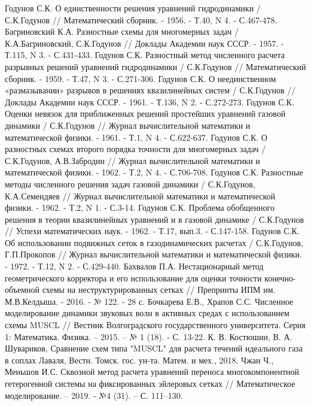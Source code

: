 \documentclass[12pt,a4paper]{article}
\begin{document}
\newpage
\begin{thebibliography}{3}
Годунов С.К. О единственности решения уравнений гидродинамики / С.К.Годунов // Математический сборник. - 1956. - Т.40, N 4. - С.467-478.
Багриновский К.А. Разностные схемы для многомерных задач / К.А.Багриновский, С.К.Годунов // Доклады Академии наук СССР. - 1957. - Т.115, N 3. - С.431-433.
Годунов С.К. Разностный метод численного расчета разрывных решений уравнений гидродинамики / С.К.Годунов // Математический сборник. - 1959. - Т.47, N 3. - С.271-306.
Годунов С.К. О неединственном «размазывании» разрывов в решениях квазилинейных систем / С.К.Годунов // Доклады Академии наук СССР. - 1961. - Т.136, N 2. - С.272-273.
Годунов С.К. Оценки невязок для приближенных решений простейших уравнений газовой динамики / С.К.Годунов // Журнал вычислительной математики и математической физики. - 1961. - Т.1, N 4. - С.622-637.
Годунов С.К. О разностных схемах второго порядка точности для многомерных задач / С.К.Годунов, А.В.Забродин // Журнал вычислительной математики и математической физики. - 1962. - Т.2, N 4. - С.706-708.
Годунов С.К. Разностные методы численного решения задач газовой динамики / С.К.Годунов, К.А.Семендяев // Журнал вычислительной математики и математической физики. - 1962. - Т.2, N 1. - С.3-14.
Годунов С.К. Проблема обобщенного решения в теории квазилинейных уравнений и в газовой динамике / С.К.Годунов // Успехи математических наук. - 1962. - Т.17, вып.3. - С.147-158.
Годунов С.К. Об использовании подвижных сеток в газодинамических расчетах / С.К.Годунов, Г.П.Прокопов // Журнал вычислительной математики и математической физики. - 1972. - Т.12, N 2. - С.429-440.
Бахвалов П.А. Нестационарный метод геометрического корректора и его использование для оценки точности конечно-объемной схемы на неструктурированных сетках // Препринты ИПМ им. М.В.Келдыша. - 2016. - № 122. - 28 с.
Бочкарева Е.В., Храпов С.С. Численное моделирование динамики звуковых волн в активных средах с использованием схемы MUSCL // Вестник Волгоградского государственного университета. Серия 1: Математика. Физика. – 2015. – № 1 (18). - С. 13-22.
К. В. Костюшин, В. А. Шувариков, Сравнение схем типа "MUSCL" для расчета течений идеального газа в соплах
Лаваля, Вестн. Томск. гос. ун-та. Матем. и мех., 2018.
Чжан Ч., Меньшов И.С. Сквозной метод расчета уравнений переноса многокомпонентной гетерогенной системы на фиксированных эйлеровых сетках // Математическое моделирование. – 2019. - №4 (31). – С. 111–130.

\end{thebibliography}
\end{document}
